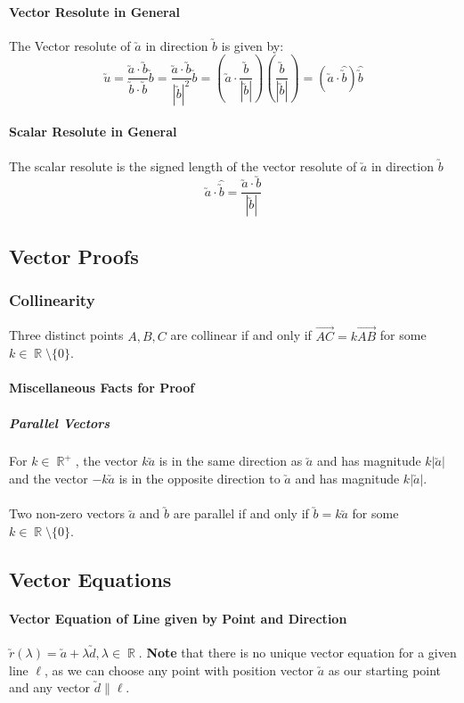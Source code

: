 \documentclass[a4paper,twoside,10pt]{article}
\DeclareMathOperator\R{\mathbb{R}}
\begin{document}
			\paragraph{Vector Resolute in General}
			The Vector resolute of $\utilde{a}$ in direction $\utilde{b}$ is given by:
			\[
				\utilde{u}=\frac{\utilde{a}\cdot\utilde{b}}{\utilde{b}\cdot\utilde{b}}\utilde{b}=\frac{\utilde{a}\cdot\utilde{b}}{|\utilde{b}|^2}\utilde{b}=\left(\utilde{a}\cdot\frac{\utilde{b}}{|\utilde{b}|}\right)\left(\frac{\utilde{b}}{|\utilde{b}|}\right)=\left(\utilde{a}\cdot\hat{\utilde{b}}\right)\hat{\utilde{b}}
			\]
			\paragraph{Scalar Resolute in General} The scalar resolute is the signed length of the vector resolute of $\utilde{a}$ in direction $\utilde{b}$
			\[
				\utilde{a}\cdot\hat{\utilde{b}}=\frac{\utilde{a}\cdot\utilde{b}}{|\utilde{b}|}
			\]
		\subsection{Vector Proofs}
			\subsubsection{Collinearity}
			Three distinct points $A, B, C$ are collinear if and only if $\overrightarrow{AC}=k\overrightarrow{AB}$ for some $k\in\R\setminus\{0\}$.
			\paragraph{Miscellaneous Facts for Proof}
				\subparagraph{Parallel Vectors} For $k\in\R^+$, the vector $k\utilde{a}$ is in the same direction as $\utilde{a}$ and has magnitude $k|\utilde{a}|$ and the vector $-k\utilde{a}$ is in the opposite direction to $\utilde{a}$ and has magnitude $k|\utilde{a}|$.\\\\
				Two non-zero vectors $\utilde{a}$ and $\utilde{b}$ are parallel if and only if $\utilde{b}=k\utilde{a}$ for some $k\in\R\setminus\{0\}$.
			
		\subsection{Vector Equations}
			\paragraph{Vector Equation of Line given by Point and Direction} $\utilde{r}(\lambda)=\utilde{a}+\lambda\utilde{d},\lambda\in\R$. \textbf{Note} that there is no unique vector equation for a given line $\ell$, as we can choose any point with position vector $\utilde{a}$ as our starting point and any vector $\utilde{d}\parallel \ell$.
			
\end{document}
